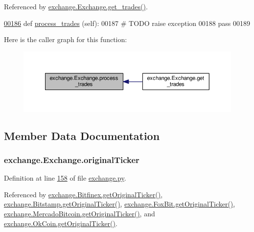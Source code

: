 Referenced by \hyperlink{exchange_8py_source_l00190}{exchange.\+Exchange.\+get\+\_\+trades()}.


\begin{DoxyCode}
\hypertarget{classexchange_1_1_exchange.tex_l00186}{}\hyperlink{classexchange_1_1_exchange_a0e67454c7053807302be914376790484}{00186}     \textcolor{keyword}{def }\hyperlink{classexchange_1_1_exchange_a0e67454c7053807302be914376790484}{process\_trades} (self):
00187         \textcolor{comment}{# TODO raise exception}
00188         \textcolor{keywordflow}{pass}
00189     
\end{DoxyCode}


Here is the caller graph for this function\+:\nopagebreak
\begin{figure}[H]
\begin{center}
\leavevmode
\includegraphics[width=350pt]{classexchange_1_1_exchange_a0e67454c7053807302be914376790484_icgraph}
\end{center}
\end{figure}




\subsection{Member Data Documentation}
\subsubsection[{\texorpdfstring{original\+Ticker}{originalTicker}}]{\setlength{\rightskip}{0pt plus 5cm}exchange.\+Exchange.\+original\+Ticker}\hypertarget{classexchange_1_1_exchange_ae326ce8c325672f3f555af59f22fd9f6}{}\label{classexchange_1_1_exchange_ae326ce8c325672f3f555af59f22fd9f6}


Definition at line \hyperlink{exchange_8py_source_l00158}{158} of file \hyperlink{exchange_8py_source}{exchange.\+py}.



Referenced by \hyperlink{exchange_8py_source_l00377}{exchange.\+Bitfinex.\+get\+Original\+Ticker()}, \hyperlink{exchange_8py_source_l00446}{exchange.\+Bitstamp.\+get\+Original\+Ticker()}, \hyperlink{exchange_8py_source_l00511}{exchange.\+Fox\+Bit.\+get\+Original\+Ticker()}, \hyperlink{exchange_8py_source_l00580}{exchange.\+Mercado\+Bitcoin.\+get\+Original\+Ticker()}, and \hyperlink{exchange_8py_source_l00639}{exchange.\+Ok\+Coin.\+get\+Original\+Ticker()}.

